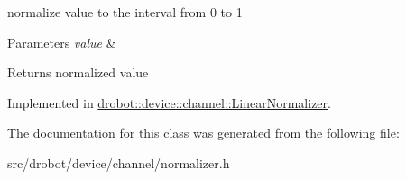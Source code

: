 normalize value to the interval from 0 to 1 


\begin{DoxyParams}{Parameters}
{\em value} & \\
\hline
\end{DoxyParams}
\begin{DoxyReturn}{Returns}
normalized value 
\end{DoxyReturn}


Implemented in \hyperlink{classdrobot_1_1device_1_1channel_1_1LinearNormalizer_a56e9bacaecd6b5310525d60ecd1a0f5c}{drobot\-::device\-::channel\-::\-Linear\-Normalizer}.



The documentation for this class was generated from the following file\-:\begin{DoxyCompactItemize}
\item 
src/drobot/device/channel/normalizer.\-h\end{DoxyCompactItemize}
